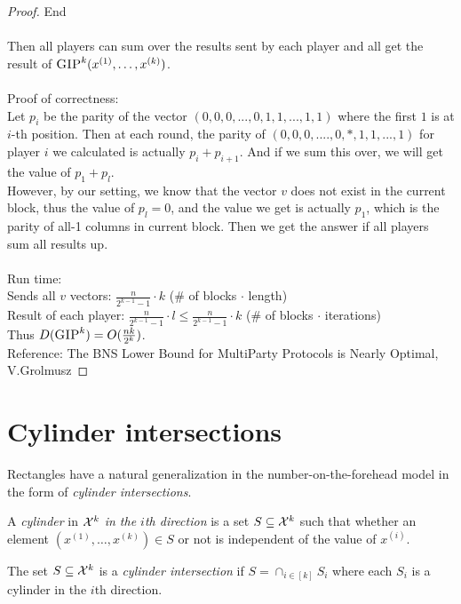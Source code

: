 \begin{proof}
	End\\
	\\
	Then all players can sum over the results sent by each player and all get the result of $\textsc{GIP}^k(x^{(1)},\ldots,x^{(k)})$.\\
	\\
	Proof of correctness: \\
	Let $p_i$ be the parity of the vector $(0,0,0,...,0,1,1,...,1,1)$ where the first $1$ is at $i$-th position. Then at each round, the parity of $(0,0,0,....,0,*,1,1,...,1)$ for player $i$ we calculated is actually $p_i + p_{i+1}$. And if we sum this over, we will get the value of $p_1 + p_l$.\\
	However, by our setting, we know that the vector $v$ does not exist in the current block, thus the value of $p_l = 0$, and the value we get is actually $p_1$, which is the parity of all-1 columns in current block. Then we get the answer if all players sum all results up.\\
	\\
	Run time:\\
	Sends all $v$ vectors: $\frac{n}{2^{k-1}-1} \cdot k$ ($\#$ of blocks $\cdot$ length)\\
	Result of each player: $\frac{n}{2^{k-1}-1} \cdot l \leq \frac{n}{2^{k-1}-1} \cdot k$ ($\#$ of blocks $\cdot$ iterations)\\
	Thus $D(\textsc{GIP}^k) = O(\frac{nk}{2^k})$.\\
	Reference: The BNS Lower Bound for Multi\-Party Protocols is Nearly Optimal, V.Grolmusz
\end{proof}




\section{Cylinder intersections}

Rectangles have a natural generalization in the number-on-the-forehead model in the form of \emph{cylinder intersections}.

\begin{definition}
	A \emph{cylinder} in $\mathcal{X}^k$ \emph{in the $i$th direction} is a set $S \subseteq \mathcal{X}^k$ such that whether an element $(x^{(1)},\ldots,x^{(k)}) \in S$ or not is independent of the value of $x^{(i)}$.
\end{definition}

\begin{definition}
	The set $S \subseteq \mathcal{X}^k$ is a \emph{cylinder intersection} if $S = \cap_{i \in [k]} S_i$ where each $S_i$ is a cylinder in the $i$th direction.
\end{definition}

